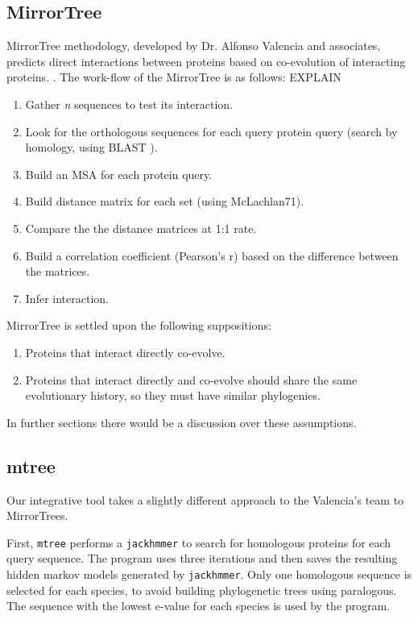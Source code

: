 \documentclass[11pt]{article}
\begin{document}
\subsection{MirrorTree}
MirrorTree methodology, developed by Dr. Alfonso Valencia and associates, predicts direct interactions between proteins based on co-evolution of interacting proteins. \cite{Pazos2001}. The work-flow of the MirrorTree is as follows: EXPLAIN
\begin{enumerate}
\setlength{\itemsep}{1pt}
	\item Gather \textit{n} sequences to test its interaction.
	\item Look for the orthologous sequences for each query protein query (search by homology, using BLAST \cite{BLAST}).
	\item Build an MSA for each protein query.
	\item Build distance matrix for each set (using McLachlan71).
	\item Compare the the distance matrices at 1:1 rate.
	\item Build a correlation coefficient (Pearson's r) based on the difference between the matrices.
	\item Infer interaction.
\end{enumerate}
MirrorTree is settled upon the following suppositions:
\begin{enumerate}
\setlength{\itemsep}{1pt}
	\item Proteins that interact directly co-evolve.
	\item Proteins that interact directly and co-evolve should share the same evolutionary history, so they must have similar phylogenies.
\end{enumerate}
In further sections there would be a discussion over these assumptions.

\subsection{mtree}
Our integrative tool takes a slightly different approach to the Valencia's team to MirrorTrees. 

First, \texttt{mtree} performs a \texttt{jackhmmer} to search for homologous proteins for each query sequence. The program uses three iterations and then saves the resulting hidden markov models generated by \texttt{jackhmmer}. Only one homologous sequence is selected for each species, to avoid building phylogenetic trees using paralogous. The sequence with the lowest e-value for each species is used by the program.
\end{document}
